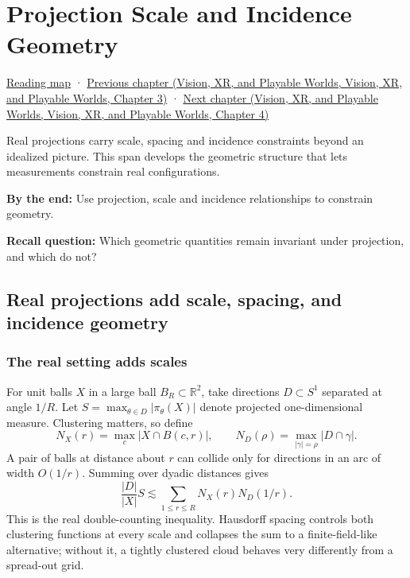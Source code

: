 \hypertarget{04-visual-computing-ii-ch033}{}
\chapter{Projection Scale and Incidence Geometry}\label{stagechapter:04-visual-computing-ii-ch033}\label{04-visual-computing-ii-ch033-projection-scale-and-incidence-geometry}

\hyperref[volume-reading-map]{Reading map} · \href{../07-Vision-XR-and-Playable-Worlds/main.pdf\#nameddest=04-visual-computing-ii-ch032-pose-estimation-and-robust-fitting}{Previous chapter (Vision, XR, and Playable Worlds, Vision, XR, and Playable Worlds, Chapter 3)} · \href{../07-Vision-XR-and-Playable-Worlds/main.pdf\#nameddest=04-visual-computing-ii-ch034-learned-3d-shapes-and-scene-representations}{Next chapter (Vision, XR, and Playable Worlds, Vision, XR, and Playable Worlds, Chapter 4)}

Real projections carry scale, spacing and incidence constraints beyond an idealized picture. This span develops the geometric structure that lets measurements constrain real configurations.

\textbf{By the end:} Use projection, scale and incidence relationships to constrain geometry.

\textbf{Recall question:} Which geometric quantities remain invariant under projection, and which do not?

\section{Real projections add scale, spacing, and incidence geometry}\label{04-visual-computing-ii-ch033-real-projections-add-scale-spacing-and-incidence-geometry}

\subsection{The real setting adds scales}\label{04-visual-computing-ii-ch033-the-real-setting-adds-scales}

For unit balls \(X\) in a large ball \(B_R\subset\mathbb R^2\), take directions \(D\subset S^1\) separated at angle \(1/R\). Let \(S=\max_{\theta\in D}|\pi_\theta(X)|\) denote projected one-dimensional measure. Clustering matters, so define \[N_X(r)=\max_c|X\cap B(c,r)|,\qquad
N_D(\rho)=\max_{|\gamma|=\rho}|D\cap\gamma|.\] A pair of balls at distance about \(r\) can collide only for directions in an arc of width \(O(1/r)\). Summing over dyadic distances gives \[\frac{|D|}{|X|}S\lesssim\sum_{1\le r\le R}N_X(r)N_D(1/r).\] This is the real double-counting inequality. Hausdorff spacing controls both clustering functions at every scale and collapses the sum to a finite-field-like alternative; without it, a tightly clustered cloud behaves very differently from a spread-out grid.

